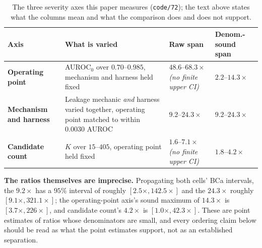\documentclass[10pt]{article} %
\begin{document}
\begin{table}[!ht]
\centering
\small
\begin{tabular}{@{}p{}p{}p{}p{}@{}}
\toprule
Axis & What is varied & Raw span & \textbf{Denom.-sound span} \\
\midrule
\textbf{Operating point} & AUROC$_0$ over $0.70$--$0.985$, mechanism and harness held fixed & $48.6$--$68.3\times$ \emph{(no finite upper CI)} & $\mathbf{2.2}$--$\mathbf{14.3\times}$ \\
\addlinespace
\textbf{Mechanism and harness} & Leakage mechanic \emph{and} harness varied together, operating point matched to within $0.0030$ AUROC & $9.2$--$24.3\times$ & $\mathbf{9.2}$--$\mathbf{24.3\times}$ \\
\addlinespace
\textbf{Candidate count} & $K$ over $15$--$405$, operating point held fixed & $1.6$--$7.1\times$ \emph{(no finite upper CI)} & $\mathbf{1.8}$--$\mathbf{4.2\times}$ \\
\bottomrule
\end{tabular}
\caption{The three severity axes this paper measures (\texttt{code/72}); the
text above states what the columns mean and what the comparison does and does
not support.}
\label{tab:magnitude-triangle}
\end{table}

\textbf{The ratios themselves are imprecise.} Propagating both cells' BCa
intervals, the $9.2\times$ has a $95\%$ interval of roughly
$[2.5\times,142.5\times]$ and the $24.3\times$ roughly
$[9.1\times,321.1\times]$; the operating-point axis's sound maximum of
$14.3\times$ is $[3.7\times,226\times]$, and candidate count's $4.2\times$ is
$[1.0\times,42.3\times]$. These are point estimates of ratios whose
denominators are small, and every ordering claim below should be read as what
the point estimates support, not as an established separation.
\end{document}
